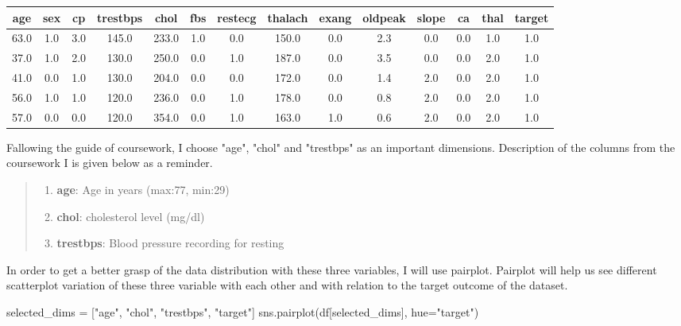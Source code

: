 \documentclass[12pt]{article}
\begin{document}
\begin{table}[h!]
    \centering
     \begin{tabular}{||c c c c c c c c c c c c c c||} 
     \hline
     age & sex & cp & trestbps & chol & fbs &restecg & thalach & exang & oldpeak & slope & ca & thal & target \\ [0.5ex] 
     \hline\hline
     63.0 & 1.0 & 3.0 & 145.0 & 233.0 & 1.0 & 0.0 & 150.0 & 0.0 & 2.3 & 0.0 & 0.0 & 1.0 & 1.0\\ 
     37.0 & 1.0 & 2.0 & 130.0 & 250.0 & 0.0 & 1.0 & 187.0 & 0.0 & 3.5 & 0.0 & 0.0 & 2.0 & 1.0\\
     41.0 & 0.0 & 1.0 & 130.0 & 204.0 & 0.0 & 0.0 & 172.0 & 0.0 & 1.4 & 2.0 & 0.0 & 2.0 & 1.0\\
     56.0 & 1.0 & 1.0 & 120.0 & 236.0 & 0.0 & 1.0 & 178.0 & 0.0 & 0.8 & 2.0 & 0.0 & 2.0 & 1.0\\
     57.0 & 0.0 & 0.0 & 120.0 & 354.0 & 0.0 & 1.0 & 163.0 & 1.0 & 0.6 & 2.0 & 0.0 & 2.0 & 1.0\\ [1ex] 
     \hline
     \end{tabular}
    \end{table}

Fallowing the guide of coursework, I choose "age", "chol" and "trestbps" as an important dimensions. Description of the columns from the coursework I is given below as a reminder.

\begin{quote}
    \begin{enumerate}
        \item \textbf{age}: Age in years (max:77, min:29)
        \item \textbf{chol}: cholesterol level (mg/dl)
        \item \textbf{trestbps}: Blood pressure recording for resting
    \end{enumerate}
\end{quote}

In order to get a better grasp of the data distribution with these three variables, I will use pairplot. Pairplot will help us see different scatterplot variation of these three variable with each other and with relation to the target outcome of the dataset.

\begin{python}
    selected_dims = ["age", "chol", "trestbps", "target"]
    sns.pairplot(df[selected_dims], hue="target")
\end{python}
\end{document}
